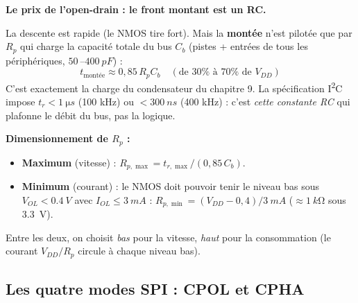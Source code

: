 \documentclass[12pt,a4paper,twoside]{book}
\begin{document}
\begin{attention}
\textbf{Le prix de l'open-drain : le front montant est un RC.}

La descente est rapide (le NMOS tire fort). Mais la \textbf{montée} n'est pilotée que par $R_p$ qui charge la capacité totale du bus $C_b$ (pistes + entrées de tous les périphériques, $\SI{50}{}$--$\SI{400}{pF}$) :
\[
\boxed{t_{\text{montée}} \approx 0{,}85 \, R_p C_b \quad (\text{de } 30\% \text{ à } 70\% \text{ de } V_{DD})}
\]
C'est exactement la charge du condensateur du chapitre 9. La spécification I\textsuperscript{2}C impose $t_r < \SI{1}{\micro s}$ (100 kHz) ou $< \SI{300}{ns}$ (400 kHz) : c'est \textit{cette constante RC} qui plafonne le débit du bus, pas la logique.

\textbf{Dimensionnement de $R_p$ :}
\begin{itemize}[nosep]
\item \textbf{Maximum} (vitesse) : $R_{p,\max} = t_{r,\max}/(0{,}85\,C_b)$.
\item \textbf{Minimum} (courant) : le NMOS doit pouvoir tenir le niveau bas sous $V_{OL} < \SI{0.4}{V}$ avec $I_{OL} \leq \SI{3}{mA}$ : $R_{p,\min} = (V_{DD}-0{,}4)/\SI{3}{mA}$ ($\approx \SI{1}{k\ohm}$ sous \SI{3.3}{V}).
\end{itemize}
Entre les deux, on choisit \textit{bas} pour la vitesse, \textit{haut} pour la consommation (le courant $V_{DD}/R_p$ circule à chaque niveau bas).
\end{attention}

\subsection{Les quatre modes SPI : CPOL et CPHA}
\end{document}
